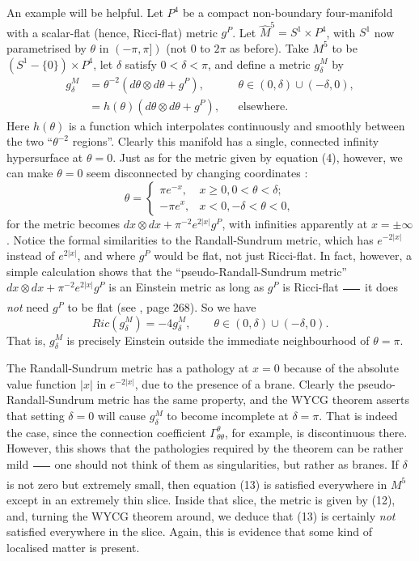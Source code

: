 \documentclass[a4paper,12pt]{article}
\newcommand{\abs}[1]{\lvert#1\rvert}
\theoremstyle{definition}
\renewcommand{\u}{\textit}
\renewcommand{\-}{$\dfrac{\quad\enspace}{\quad}$}
\begin{document}
An example will be helpful. Let $P^4$ be a compact non-boundary four-manifold with a scalar-flat (hence, Ricci-flat) metric $g^P$. Let $\hat{M}^5=S^1\times P^4$, with $S^1$ now parametrised by $\theta$ in $(-\pi,\pi])$ (not 0 to $2\pi$ as before). Take $M^5$ to be $(S^1-\{0\})\times P^4$, let $\delta$ satisfy $0<\delta<\pi$, and define a metric $g^M_\delta$ by
\begin{align}
g^M_\delta&=\theta^{-2}(d\theta\otimes d\theta +g^P),&& \theta\in (0,\delta)\cup (-\delta,0), \\
&=h(\theta)(d\theta\otimes d\theta +g^P),&& \text{elsewhere.}
\end{align} 
Here $h(\theta)$ is a function which interpolates continuously and smoothly between the two ``$\theta^{-2}$ regions''. Clearly this manifold has a single, connected infinity hypersurface at $\theta=0$. Just as for the metric given by equation (4), however, we can make $\theta=0$ seem disconnected by changing coordinates :
\begin{equation*}
\theta=\begin{cases}\pi e^{-x},&x\geq0,0<\theta<\delta;\\
-\pi e^{x},& x<0,-\delta<\theta<0,\end{cases}
\end{equation*}
for the metric becomes $dx\otimes dx+\pi^{-2} e^{2\abs{x}}g^P$, with infinities apparently at $x=\pm \infty$. Notice the formal similarities to the Randall-Sundrum \cite{21} metric, which has $e^{-2\abs{x}}$ instead of $e^{2\abs{x}}$, and where $g^P$ would be flat, not just Ricci-flat. In fact, however, a simple calculation shows that the ``pseudo-Randall-Sundrum metric'' $dx\otimes dx + \pi^{-2}e^{2\abs{x}}g^P$ is an Einstein metric as long as $g^P$ is Ricci-flat \- it does \u{not} need $g^P$ to be flat (see \cite{8}, page 268). So we have 
\begin{equation}
Ric(g^M_\delta)=-4g^M_\delta, \qquad \theta\in (0,\delta)\cup(-\delta,0).
\end{equation}
That is, $g^M_\delta$ is precisely Einstein outside the immediate neighbourhood of $\theta=\pi$.

The Randall-Sundrum metric has a pathology at $x=0$ because of the absolute value function $\abs{x}$ in $e^{-2\abs{x}}$, due to the presence of a brane. Clearly the pseudo-Randall-Sundrum metric has the same property, and the WYCG theorem asserts that setting $\delta=0$ will cause $g^M_\delta$ to become incomplete at $\delta=\pi$. That is indeed the case, since the connection coefficient $\Gamma^\theta_{\theta\theta}$, for example, is discontinuous there. However, this shows that the pathologies required by the theorem can be rather mild \- one should not think of them as singularities, but rather as branes. If $\delta$ is not zero but extremely small, then equation (13) is satisfied everywhere in $M^5$ except in an extremely thin slice. Inside that slice, the metric is given by (12), and, turning the WYCG theorem around, we deduce that (13) is certainly \u{not} satisfied everywhere in the slice. Again, this is evidence that some kind of localised matter is present.
\end{document}
